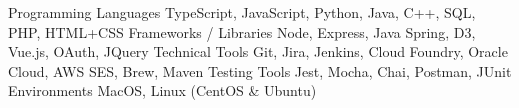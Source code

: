 \begin{cvskills}
    \cvskill
    {Programming Languages} %
    {TypeScript, JavaScript, Python, Java, C++, SQL, PHP, HTML+CSS} %
    \cvskill
    {Frameworks / Libraries} %
    {Node, Express, Java Spring, D3, Vue.js, OAuth, JQuery} %
    \cvskill
    {Technical Tools} %
    {Git, Jira, Jenkins, Cloud Foundry, Oracle Cloud, AWS SES, Brew, Maven} %
    \cvskill
    {Testing Tools} %
    {Jest, Mocha, Chai, Postman, JUnit} %
    \cvskill
    {Environments} %
    {MacOS, Linux (CentOS \& Ubuntu)} %
\end{cvskills}
